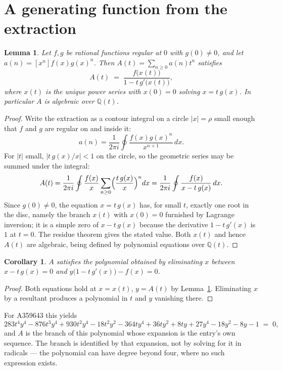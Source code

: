 \documentclass[11pt,a4paper]{article}
\theoremstyle{plain}
\newtheorem{lemma}[theorem]{Lemma}
\newtheorem{corollary}[theorem]{Corollary}
\theoremstyle{definition}
\begin{document}
\section{A generating function from the extraction}

\begin{lemma}\label{lem:diag}
Let $f,g$ be rational functions regular at $0$ with $g(0)\neq0$, and let
$a(n)=[x^{n}]f(x)g(x)^{n}$. Then $A(t)=\sum_{n\ge0}a(n)t^{n}$ satisfies
\[
A(t)\;=\;\frac{f\bigl(x(t)\bigr)}{1-t\,g'\bigl(x(t)\bigr)},
\]
where $x(t)$ is the unique power series with $x(0)=0$ solving $x=t\,g(x)$. In particular
$A$ is algebraic over $\mathbb{Q}(t)$.
\end{lemma}

\begin{proof}
Write the extraction as a contour integral on a circle $|x|=\rho$ small enough that $f$
and $g$ are regular on and inside it:
\[
a(n)=\frac{1}{2\pi i}\oint \frac{f(x)g(x)^{n}}{x^{n+1}}\,dx .
\]
For $|t|$ small, $|t\,g(x)/x|<1$ on the circle, so the geometric series may be summed
under the integral:
\[
A(t)=\frac{1}{2\pi i}\oint\frac{f(x)}{x}\sum_{n\ge0}\Bigl(\frac{t\,g(x)}{x}\Bigr)^{n}dx
     =\frac{1}{2\pi i}\oint\frac{f(x)}{x-t\,g(x)}\,dx .
\]
Since $g(0)\neq0$, the equation $x=t\,g(x)$ has, for small $t$, exactly one root in the
disc, namely the branch $x(t)$ with $x(0)=0$ furnished by Lagrange inversion; it is a
simple zero of $x-t\,g(x)$ because the derivative $1-t\,g'(x)$ is $1$ at $t=0$. The
residue theorem gives the stated value. Both $x(t)$ and hence $A(t)$ are algebraic,
being defined by polynomial equations over $\mathbb{Q}(t)$.
\end{proof}

\begin{corollary}\label{cor:minpoly}
$A$ satisfies the polynomial obtained by eliminating $x$ between
$x-t\,g(x)=0$ and $y\bigl(1-t\,g'(x)\bigr)-f(x)=0$.
\end{corollary}

\begin{proof}
Both equations hold at $x=x(t)$, $y=A(t)$ by Lemma~\ref{lem:diag}. Eliminating $x$ by a
resultant produces a polynomial in $t$ and $y$ vanishing there.
\end{proof}

For A359643 this yields
\[
283 t^{4} y^{4} - 876 t^{3} y^{4} + 930 t^{2} y^{4} - 18 t^{2} y^{2} - 364 t y^{4} + 36 t y^{2} + 8 t y + 27 y^{4} - 18 y^{2} - 8 y - 1 \;=\;0 ,
\]
and $A$ is the branch of this polynomial whose expansion is the entry's own sequence.
The branch is identified by that expansion, not by solving for it in radicals --- the
polynomial can have degree beyond four, where no such expression exists.
\end{document}

